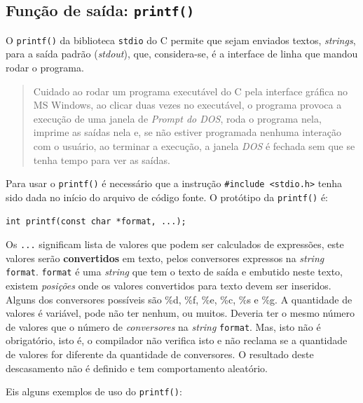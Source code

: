 \documentclass[
]{article}
\begin{document}
\hypertarget{funuxe7uxe3o-de-sauxedda-printf}{%
\subsection{\texorpdfstring{Função de saída:
\texttt{printf()}}{Função de saída: printf()}}\label{funuxe7uxe3o-de-sauxedda-printf}}

O \texttt{printf()} da biblioteca \texttt{stdio} do C permite que sejam
enviados textos, \emph{strings}, para a saída padrão (\emph{stdout}),
que, considera-se, é a interface de linha que mandou rodar o programa.

\begin{quote}
Cuidado ao rodar um programa executável do C pela interface gráfica no
MS Windows, ao clicar duas vezes no executável, o programa provoca a
execução de uma janela de \emph{Prompt do DOS}, roda o programa nela,
imprime as saídas nela e, se não estiver programada nenhuma interação
com o usuário, ao terminar a execução, a janela \emph{DOS} é fechada sem
que se tenha tempo para ver as saídas.
\end{quote}

Para usar o \texttt{printf()} é necessário que a instrução
\texttt{\#include\ \textless{}stdio.h\textgreater{}} tenha sido dada no
início do arquivo de código fonte. O protótipo da \texttt{printf()} é:

\begin{verbatim}
int printf(const char *format, ...);
\end{verbatim}

Os \texttt{...} significam lista de valores que podem ser calculados de
expressões, este valores serão \textbf{convertidos} em texto, pelos
conversores expressos na \emph{string} \texttt{format}. \texttt{format}
é uma \emph{string} que tem o texto de saída e embutido neste texto,
existem \emph{posições} onde os valores convertidos para texto devem ser
inseridos. Alguns dos conversores possíveis são \%d, \%f, \%e, \%c, \%s
e \%g. A quantidade de valores é variável, pode não ter nenhum, ou
muitos. Deveria ter o mesmo número de valores que o número de
\emph{conversores} na \emph{string} \texttt{format}. Mas, isto não é
obrigatório, isto é, o compilador não verifica isto e não reclama se a
quantidade de valores for diferente da quantidade de conversores. O
resultado deste descasamento não é definido e tem comportamento
aleatório.

Eis alguns exemplos de uso do \texttt{printf()}:
\end{document}
